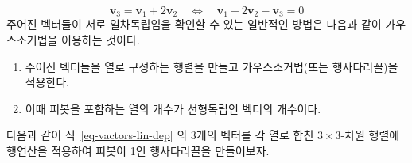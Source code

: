 \documentclass[
  11pt,
  a4paper,
  oneside]{scrbook}
\providecommand{\tightlist}{%
  \setlength{\itemsep}{0pt}\setlength{\parskip}{0pt}}\usepackage{longtable,booktabs,array}
\theoremstyle{definition}
\theoremstyle{definition}
\theoremstyle{plain}
\theoremstyle{remark}
\begin{document}
\[ 
\pmb v_3 = \pmb v_1 + 2 \pmb v_2 \quad \Longleftrightarrow \quad    \pmb v_1 + 2 \pmb v_2 -\pmb v_3 = 0 
\] 주어진 벡터들이 서로 일차독립임을 확인할 수 있는 일반적인 방법은
다음과 같이 가우스소거법을 이용하는 것이다.

\begin{enumerate}
\def\labelenumi{\arabic{enumi}.}
\tightlist
\item
  주어진 벡터들을 열로 구성하는 행렬을 만들고 가우스소거법(또는
  행사다리꼴)을 적용한다.
\item
  이때 피봇을 포함하는 열의 개수가 선형독립인 벡터의 개수이다.
\end{enumerate}

다음과 같이 식~\ref{eq-vactors-lin-dep} 의 3개의 벡터를 각 열로 합친
\(3 \times 3\)-차원 행렬에 행연산을 적용하여 피봇이 1인 행사다리꼴을
만들어보자.
\end{document}
